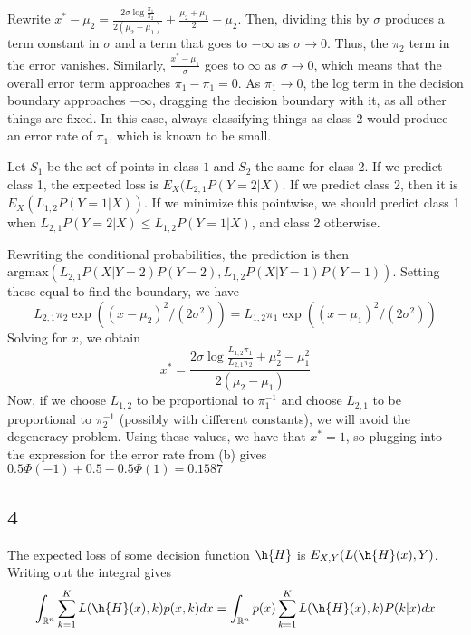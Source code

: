 \documentclass{article}
\newcommand{\nc}{\newcommand}
\newcommand{\rn}{\mathbb{R}}
\begin{document}
Rewrite $x^*-\mu_2=\frac{2\sigma\log\frac{\pi_1}{\pi_2}}{2(\mu_2-\mu_1)}+\frac{\mu_2+\mu_1}{2}-\mu_2$. Then, dividing this by $\sigma$ produces a term constant in $\sigma$ and a term that goes to $-\infty$ as $\sigma\to0$. Thus, the $\pi_2$ term in the error vanishes. Similarly, $\frac{x^*-\mu_1}{\sigma}$ goes to $\infty$ as $\sigma\to0$, which means that the overall error term approaches $\pi_1-\pi_1=0$.
As $\pi_1\to0$, the log term in the decision boundary approaches $-\infty$, dragging the decision boundary with it, as all other things are fixed. In this case, always classifying things as class 2 would produce an error rate of $\pi_1$, which is known to be small.
{
\nc{\lot}{L_{1,2}}
\nc{\lto}{L_{2,1}}
Let $S_1$ be the set of points in class $1$ and $S_2$ the same for class 2. If we predict class 1, the expected loss is $E_X(\lto P(Y=2|X)$. If we predict class 2, then it is $E_X(\lot P(Y=1|X))$. If we minimize this pointwise, we should predict class 1 when $\lto P(Y=2|X)\leq\lot P(Y=1|X)$, and class 2 otherwise.

Rewriting the conditional probabilities, the prediction is then $\text{argmax}\left(\lto P(X|Y=2)P(Y=2), \lot P(X|Y=1)P(Y=1)\right)$. Setting these equal to find the boundary, we have
\[\lto \pi_2\exp\left((x-\mu_2)^2/(2\sigma^2)\right)=\lot\pi_1\exp\left((x-\mu_1)^2/(2\sigma^2)\right)\]
Solving for $x$, we obtain
\[x^*=\frac{2\sigma\log\frac{\lot\pi_1}{\lto\pi_2}+\mu_2^2-\mu_1^2}{2(\mu_2-\mu_1)}\]
Now, if we choose $\lot$ to be proportional to $\pi_1^{-1}$ and choose $\lto$ to be proportional to $\pi_2^{-1}$ (possibly with different constants), we will avoid the degeneracy problem.
Using these values, we have that $x^*=1$, so plugging into the expression for the error rate from (b) gives $0.5\Phi(-1)+0.5-0.5\Phi(1)=0.1587$
}
\subsection*{4}
The expected loss of some decision function $\h{H}$ is $E_{X, Y}(L(\h{H}(x), Y)$. Writing out the integral gives
\[\int_{\rn^n}\sum_{k=1}^KL(\h{H}(x), k)p(x, k) dx=\int_{\rn^n}p(x)\sum_{k=1}^KL(\h{H}(x), k)P(k|x)dx\]

\end{document}
